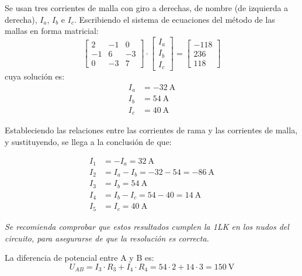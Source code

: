 \documentclass[10pt]{article}
\begin{document}
Se usan tres corrientes de malla con giro a derechas, de nombre (de
izquierda a derecha), $I_a$, $I_b$ e $I_c$. Escribiendo el sistema de
ecuaciones del método de las mallas en forma matricial:
\begin{equation*}
  \begin{bmatrix}
    2 & -1 & 0 \\
    -1 & 6 & -3 \\
    0 & -3 & 7
  \end{bmatrix}
  \cdot
  \begin{bmatrix}
    I_a\\
    I_b\\
    I_c
  \end{bmatrix}
  =
  \begin{bmatrix}
    -118\\
    236\\
    118
  \end{bmatrix}
\end{equation*}
cuya solución es:
\begin{align*}
  I_a &= \qty{-32}{\ampere}\\
  I_b &= \qty{54}{\ampere}\\
  I_c &= \qty{40}{\ampere}
\end{align*}

Estableciendo las relaciones entre las corrientes de rama y las
corrientes de malla, y sustituyendo, se llega a la conclusión de que:

\begin{align*}
  I_1 &= -I_a=\boxed{\qty{32}{\ampere}}\\
  I_2 &= I_a - I_b=-32-54=\boxed{\qty{-86}{\ampere}}\\
  I_3 &= I_b=\boxed{\qty{54}{\ampere}}\\
  I_4 &= I_b - I_c=54-40=\boxed{\qty{14}{\ampere}}\\
  I_5 &= I_c=\boxed{\qty{40}{\ampere}}
\end{align*}

\vspace{4mm}

\emph{Se recomienda comprobar que estos resultados cumplen la 1LK en
  los nudos del circuito, para asegurarse de que la resolución es
  correcta.}

\vspace{4mm}

La diferencia de potencial entre A y B es:
\begin{equation*}
  U_{AB} = I_3 \cdot R_3 + I_4 \cdot R_4 = 54\cdot 2+14\cdot 3= \boxed{\qty{150}{\volt}}
\end{equation*}
\end{document}
